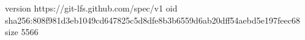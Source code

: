version https://git-lfs.github.com/spec/v1
oid sha256:808f981d3eb1049cd647825c5d8dfe8b3b6559d6ab20dff54aebd5e197feec68
size 5566
